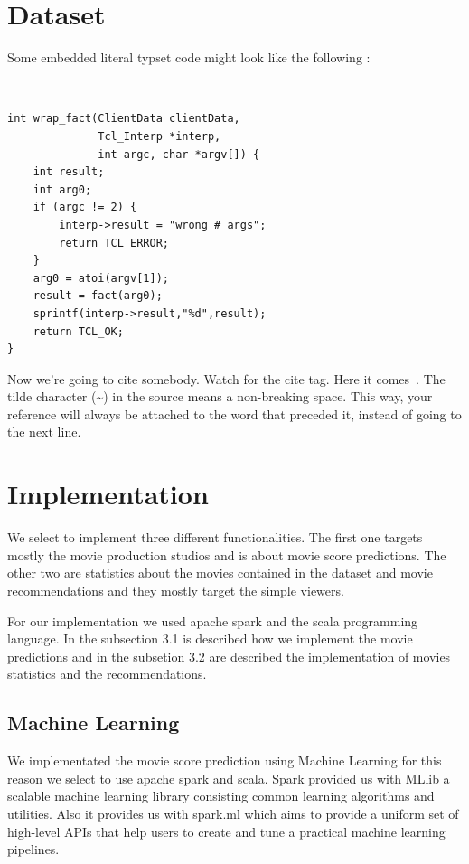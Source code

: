 \documentclass[letterpaper,twocolumn,10pt]{article}
\begin{document}
\section{Dataset}

Some embedded literal typset code might 
look like the following :

{\tt \small
\begin{verbatim}
int wrap_fact(ClientData clientData,
              Tcl_Interp *interp,
              int argc, char *argv[]) {
    int result;
    int arg0;
    if (argc != 2) {
        interp->result = "wrong # args";
        return TCL_ERROR;
    }
    arg0 = atoi(argv[1]);
    result = fact(arg0);
    sprintf(interp->result,"%d",result);
    return TCL_OK;
}
\end{verbatim}
}

Now we're going to cite somebody.  Watch for the cite tag.
Here it comes~\cite{Chaum1981,Diffie1976}.  The tilde character (\~{})
in the source means a non-breaking space.  This way, your reference will
always be attached to the word that preceded it, instead of going to the
next line.

\section{Implementation}
We select to implement three different functionalities. The first one targets mostly the movie production studios and is about movie score predictions. The other two are statistics about the movies contained in the dataset and movie recommendations and they mostly target the simple viewers. \par 
For our implementation we used apache spark and the scala programming language. In the subsection 3.1 is described how we implement the movie predictions and in the subsetion 3.2 are described the implementation of movies statistics and the recommendations.
\subsection{Machine Learning}
We implementated the movie score prediction using Machine Learning for this reason we select to use apache spark and scala. Spark provided us with MLlib a scalable machine learning library consisting common learning algorithms and utilities. Also it provides us with spark.ml which aims to provide a uniform set of high-level APIs that help users to create and tune a practical machine learning pipelines. \par 
\end{document}
